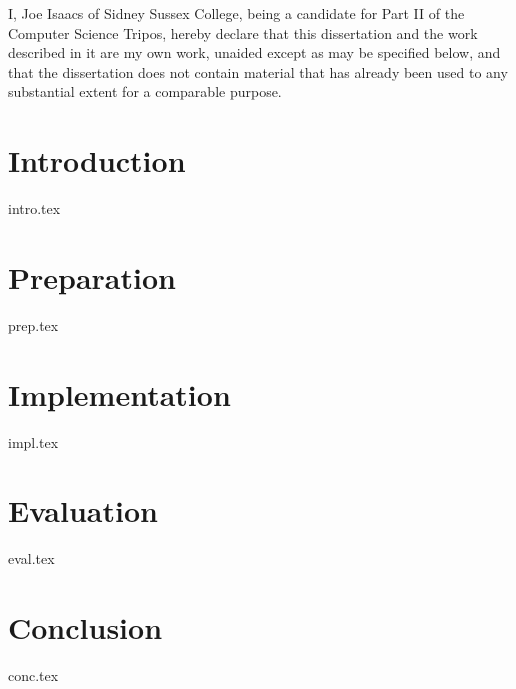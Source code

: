 \documentclass[12pt,a4paper,twoside,openright]{book}
\numberwithin{subcase}{case}
\begin{document}
I, Joe Isaacs of Sidney Sussex College, being a candidate for Part II of the Computer Science Tripos, hereby declare
that this dissertation and the work described in it are my own work,
unaided except as may be specified below, and that the dissertation
does not contain material that has already been used to any substantial
extent for a comparable purpose.

\bigskip
{}

\medskip
{}

\tableofcontents

\listoffigures
\begingroup
\let\clearpage\relax
\listoftables
\endgroup

\newpage

\mainmatter

\pagestyle{headings}

\chapter{Introduction}

{intro.tex}

\chapter{Preparation}

{prep.tex}

\chapter{Implementation}

{impl.tex}

\chapter{Evaluation}

{eval.tex}

\chapter{Conclusion}

{conc.tex}


\printbibliography

\appendix
\end{document}
